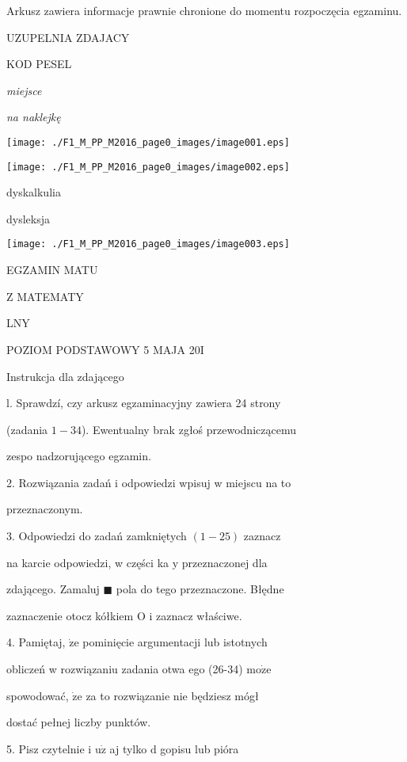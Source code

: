 \documentclass[a4paper,12pt]{article}
\begin{document}
Arkusz zawiera informacje prawnie chronione do momentu rozpoczęcia egzaminu.

UZUPELNIA ZDAJACY

KOD PESEL

{\it miejsce}

{\it na naklejkę}
\begin{center}
\texttt{[image: ./F1\_M\_PP\_M2016\_page0\_images/image001.eps]}

\texttt{[image: ./F1\_M\_PP\_M2016\_page0\_images/image002.eps]}
\end{center}
\square  dyskalkulia

\fbox{} dysleksja
\begin{center}
\texttt{[image: ./F1\_M\_PP\_M2016\_page0\_images/image003.eps]}
\end{center}
EGZAMIN MATU

Z MATEMATY

LNY

POZIOM PODSTAWOWY  5 MAJA 20I

Instrukcja dla zdającego

l. Sprawdzí, czy arkusz egzaminacyjny zawiera 24 strony

(zadania $1-34$). Ewentualny brak zgłoś przewodniczącemu

zespo nadzorującego egzamin.

2. Rozwiązania zadań i odpowiedzi wpisuj w miejscu na to

przeznaczonym.

3. Odpowiedzi do zadań zamkniętych $(1-25)$ zaznacz

na karcie odpowiedzi, w części ka $\mathrm{y}$ przeznaczonej dla

zdającego. Zamaluj $\blacksquare$ pola do tego przeznaczone. Błędne

zaznaczenie otocz kółkiem $\mathrm{O}$ i zaznacz właściwe.

4. Pamiętaj, $\dot{\mathrm{z}}\mathrm{e}$ pominięcie argumentacji lub istotnych

obliczeń w rozwiązaniu zadania otwa ego (26-34) $\mathrm{m}\mathrm{o}\dot{\mathrm{z}}\mathrm{e}$

spowodować, $\dot{\mathrm{z}}\mathrm{e}$ za to rozwiązanie nie będziesz mógł

dostać pełnej liczby punktów.

5. Pisz czytelnie i $\mathrm{u}\dot{\mathrm{z}}$ aj tylko $\mathrm{d}$ gopisu lub pióra
\end{document}
